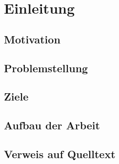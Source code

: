 \chapter{Einleitung}

\section{Motivation}

\section{Problemstellung}

\section{Ziele}

\section{Aufbau der Arbeit}

\section{Verweis auf Quelltext}
